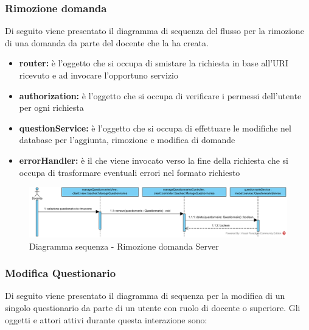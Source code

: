 \documentclass[12pt,a4paper]{article}
\begin{document}
\newpage
\subsubsection{Rimozione domanda}
Di seguito viene presentato il diagramma di sequenza del flusso per la rimozione di una domanda da parte del docente che la ha creata.

\begin{itemize}
	\item \textbf{router:} è l'oggetto che si occupa di smistare la richiesta in base all’URI ricevuto e ad invocare l’opportuno servizio
	\item \textbf{authorization:} è l'oggetto che si occupa di verificare i permessi dell'utente per ogni richiesta	
	\item \textbf{questionService:} è l'oggetto che si occupa di effettuare le modifiche nel database per l'aggiunta, rimozione e modifica di domande
	\item \textbf{errorHandler:} è il  che viene invocato verso la fine della richiesta che si occupa di trasformare eventuali errori nel formato  richiesto
\end{itemize}

\begin{center}
	\begin{figure}[H]
		\centering \includegraphics[max width=\myheight, angle=90]{../img/diagrammiSequenza/rimozioneQuestionarioClient.png}
		\caption{Diagramma sequenza - Rimozione domanda Server}
	\end{figure}
\end{center}

\newpage
\subsubsection{Modifica Questionario}
Di seguito viene presentato il diagramma di sequenza per la modifica di un singolo questionario da parte di un utente con ruolo di docente o superiore. Gli oggetti e attori attivi durante questa interazione sono:
\end{document}
